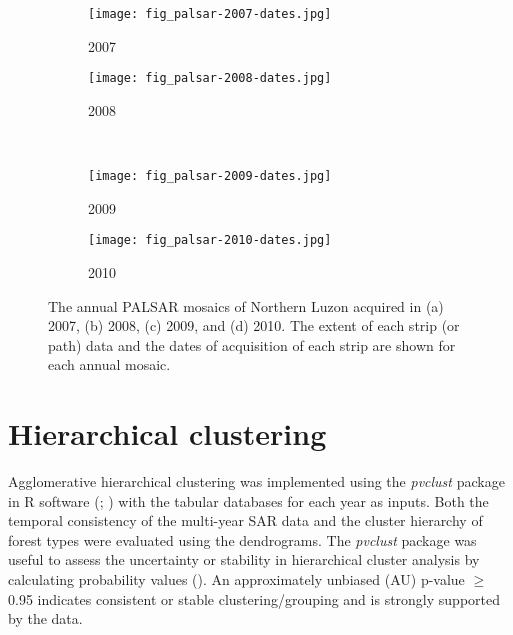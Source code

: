 \begin{figure}[!ht] \centering
	\captionsetup[subfigure]{width=2.0in} %
	\begin{subfigure}[t]{0.49\textwidth}
		\texttt{[image: fig\_palsar-2007-dates.jpg]}
		\caption[Annual PALSAR mosaics.]{2007}
		\label{fig: method-fig3.6a}
	\end{subfigure}
	\begin{subfigure}[t]{0.49\textwidth}
		\texttt{[image: fig\_palsar-2008-dates.jpg]}
		\caption[Annual PALSAR mosaics.]{2008}
		\label{fig: method-fig3.6b}
	\end{subfigure}\\
	\vspace{10pt}
	\begin{subfigure}[t]{0.49\textwidth}
		\texttt{[image: fig\_palsar-2009-dates.jpg]}
		\caption[Annual PALSAR mosaics.]{2009}
		\label{fig: method-fig3.6c}
	\end{subfigure}
	\begin{subfigure}[t]{0.49\textwidth}
		\texttt{[image: fig\_palsar-2010-dates.jpg]}
		\caption[Annual PALSAR mosaics.]{2010}
		\label{fig: method-fig3.6d}
	\end{subfigure}
	\caption[The annual PALSAR mosaics of Northern Luzon acquired in 2007, 2008, 2009, and 2010.]{The annual PALSAR mosaics of Northern Luzon acquired in (a) 2007, (b) 2008, (c) 2009, and (d) 2010. The extent of each strip (or path) data and the dates of acquisition of each strip are shown for each annual mosaic.}
	\label{fig: method-fig3.6}
\end{figure}

\section{Hierarchical clustering}
\label{sec: method-clustering}

Agglomerative hierarchical clustering was implemented using the \textit{pvclust} package in R software (\cite{suzuki_pvclust:_2006}; \cite{suzuki_pvclust:_2014}) with the tabular databases for each year as inputs. Both the temporal consistency of the multi-year SAR data and the cluster hierarchy of forest types were evaluated using the dendrograms. The \textit{pvclust} package was useful to assess the uncertainty or stability in hierarchical cluster analysis by calculating probability values (\cite{suzuki_pvclust:_2014}). An approximately unbiased (AU) p-value $\geq$ 0.95 indicates consistent or stable clustering/grouping and is strongly supported by the data.\\


